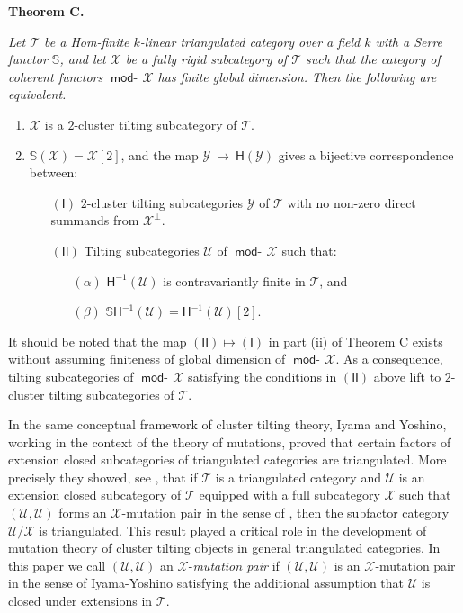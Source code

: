 \documentclass[oneside, a4paper,reqno]{amsart}
\numberwithin{equation}{section}
\theoremstyle{definition}
\begin{document}
 {\bf Theorem C.} {\em Let ${\mathcal T}$ be a Hom-finite  $k$-linear triangulated category over a field $k$ with a Serre functor $\mathbb S$, and let ${\mathcal X}$ be a fully rigid subcategory of ${\mathcal T}$ such that the category of coherent functors $\operatorname*{\mathsf{mod}-\!}{\mathcal X}$ has finite global dimension. Then the following are equivalent.
\begin{enumerate}
\item ${\mathcal X}$ is a $2$-cluster tilting subcategory of ${\mathcal T}$.
\item $\mathbb S({\mathcal X}) = {\mathcal X}[2]$, and the map ${\mathcal Y} \ \longmapsto \ \mathsf{H}({\mathcal Y})$ gives a bijective correspondence between:
\begin{enumerate}
\item[$\mathsf{(I)}$] $2$-cluster tilting subcategories ${\mathcal Y}$ of ${\mathcal T}$ with no non-zero direct summands from ${\mathcal X}^{\bot}$. 
\item[$\mathsf{(II)}$] Tilting subcategories ${\mathcal U}$ of $\operatorname*{\mathsf{mod}-\!}{\mathcal X}$ such that:
\begin{enumerate}
\item[$(\alpha)$] $\mathsf{H}^{-1}({\mathcal U})$ is contravariantly finite in ${\mathcal T}$, and 
\item[$(\beta)$] $\mathbb S\mathsf{H}^{-1}({\mathcal U}) = \mathsf{H}^{-1}({\mathcal U})[2]$. 
\end{enumerate}
\end{enumerate}
\end{enumerate}
}

\medskip
 
 It should be noted that the map $\mathsf{(II)} \longmapsto \mathsf{(I)}$ in part (ii) of Theorem C  exists without assuming finiteness of global dimension of $\operatorname*{\mathsf{mod}-\!}{\mathcal X}$. As a consequence,  tilting subcategories of $\operatorname*{\mathsf{mod}-\!}{\mathcal X}$ satisfying the conditions in $\mathsf{(II)}$ above lift to $2$-cluster tilting subcategories of ${\mathcal T}$. 
 
 In the same conceptual framework of cluster tilting theory, Iyama and Yoshino, working in the context of the theory of mutations, proved that certain factors of extension closed subcategories of triangulated categories are triangulated. More precisely they showed, see \cite[Theorem 4.2]{IY}, that if ${\mathcal T}$ is a triangulated category and ${\mathcal U}$ is an extension closed subcategory of ${\mathcal T}$ equipped with a full subcategory ${\mathcal X}$ such that $({\mathcal U},{\mathcal U})$ forms an ${\mathcal X}$-mutation pair in the sense of \cite{IY}, then the subfactor category ${\mathcal U}/{\mathcal X}$ is triangulated.  This result played a critical role in the development of mutation theory of cluster tilting objects in general triangulated categories.  In this paper we call $({\mathcal U},{\mathcal U})$ an ${\mathcal X}$-{\em mutation pair} if $({\mathcal U},{\mathcal U})$ is an ${\mathcal X}$-mutation pair in the sense of Iyama-Yoshino satisfying the additional assumption that  ${\mathcal U}$ is closed under extensions in ${\mathcal T}$. 
 
\end{document}
